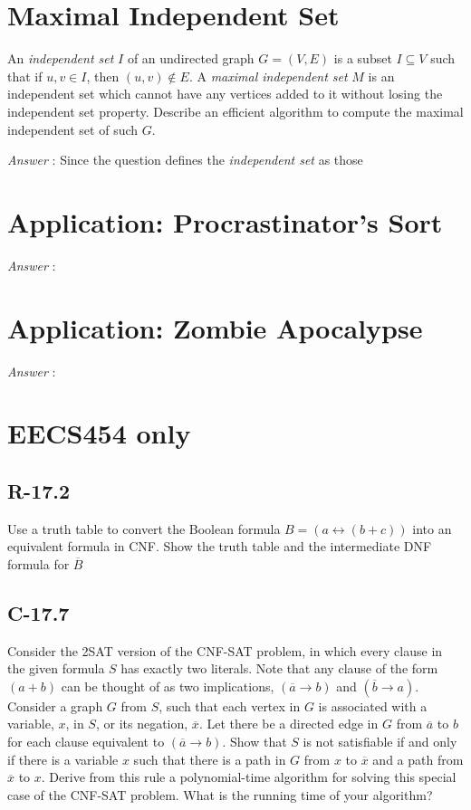\documentclass[11pt]{article}
\begin{document}
\section{Maximal Independent Set}
An \emph{independent set} $I$ of an undirected graph $G=(V,E)$ is a subset $I\subseteq V$ such that if $u,v \in I$, then $(u,v)\not \in E$. A \emph{maximal independent set} $M$ is an independent set which cannot have any vertices added to it without losing the independent set property. Describe an efficient algorithm to compute the maximal independent set of such $G$.

\noindent\emph{Answer} : Since the question defines the \emph{independent set} as those 

\section{Application: Procrastinator's Sort}
\noindent\emph{Answer} : 

\section{Application: Zombie Apocalypse}
\noindent\emph{Answer} : 

\section{EECS454 only}
\subsection{R-17.2}
Use a truth table to convert the Boolean formula $B=(a\leftrightarrow(b+c))$ into an equivalent formula in CNF. Show the truth table and the intermediate DNF formula for $\overline{B}$
\subsection{C-17.7}
Consider the 2SAT version of the CNF-SAT problem, in which every clause in the given formula $S$ has exactly two literals. Note that any clause of the form $(a + b)$ can be thought of as two implications, $(\overline{a} \rightarrow b)$ and $(\overline{b} \rightarrow a)$. Consider a graph $G$ from $S$, such that each vertex in $G$ is associated with a variable, $x$, in $S$, or its negation, $\overline{x}$. Let there be a directed edge in $G$ from $\overline{a}$ to $b$ for each clause equivalent to $(\overline{a} \rightarrow b)$. Show that $S$ is not satisfiable if and only if there is a variable $x$ such that there is a path in $G$ from $x$ to $\overline{x}$ and a path from $\overline{x}$ to $x$. Derive from this rule a polynomial-time algorithm for solving this special case of the CNF-SAT problem. What is the running time of your algorithm?
\end{document}
